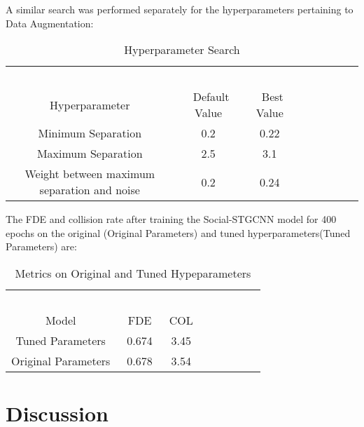 {A similar search was performed separately for the hyperparameters pertaining to Data Augmentation:

\begin{table}[!h]
\caption{Hyperparameter Search} %
\centering %
\begin{tabular}{ccc rrrrr} 
\hline 
&\ \ \ \ \ \\
Hyperparameter&\ Default Value&\ Best Value&\ \\ [0.5ex]
\hline 
Minimum Separation &  0.2 & 0.22\\
Maximum Separation & 2.5 & 3.1\\
Weight between maximum separation and noise &  0.2 & 0.24\\
\hline
\end{tabular}
\label{tab:hresult}
\end{table}

The FDE and collision rate after training the Social-STGCNN model for 400 epochs on the original (Original Parameters) and tuned hyperparameters(Tuned Parameters) are:
\begin{table}[!h]
\caption{Metrics on Original and Tuned Hypeparameters} %
\centering %
\begin{tabular}{ccc rrrrr} 
\hline 
&\ \ \ \ \ \\
Model&\ FDE&\ COL&\ \\ [0.5ex]
\hline 
Tuned Parameters&\ 0.674&\ 3.45&\ \\
Original Parameters&\ 0.678&\ 3.54&\ \\

\hline
\end{tabular}
\label{tab:hresult}
\end{table}

\section{Discussion}

}
